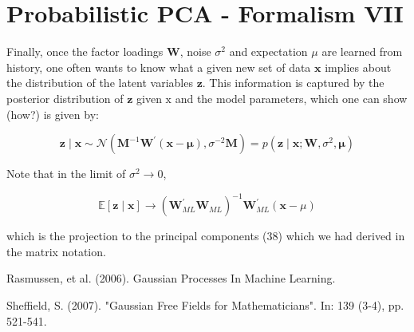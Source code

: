 \documentclass[11pt]{article}
\theoremstyle{plain} %
\theoremstyle{remark}
\begin{document}
\section*{Probabilistic PCA - Formalism VII}
Finally, once the factor loadings $\mathbf{W}$, noise $\sigma^{2}$ and expectation $\mu$ are learned from history, one often wants to know what a given new set of data $\mathbf{x}$ implies about the distribution of the latent variables $\mathbf{z}$. This information is captured by the posterior distribution of $\mathbf{z}$ given $\mathrm{x}$ and the model parameters, which one can show (how?) is given by:

$$
\mathbf{z} \mid \mathbf{x} \sim \mathcal{N}\left(\mathbf{M}^{-1} \mathbf{W}^{\prime}(\mathbf{x}-\boldsymbol{\mu}), \sigma^{-2} \mathbf{M}\right)=p\left(\mathbf{z} \mid \mathbf{x} ; \mathbf{W}, \sigma^{2}, \boldsymbol{\mu}\right)
$$

Note that in the limit of $\sigma^{2} \rightarrow 0$,

$$
\mathbb{E}[\mathbf{z} \mid \mathbf{x}] \rightarrow\left(\mathbf{W}_{M L}^{\prime} \mathbf{W}_{M L}\right)^{-1} \mathbf{W}_{M L}^{\prime}(\mathbf{x}-\mu)
$$

which is the projection to the principal components (38) which we had derived in the matrix notation.



\begin{thebibliography}{2}
  Rasmussen, et al. (2006). Gaussian Processes In Machine Learning.

  Sheffield, S. (2007). "Gaussian Free Fields for Mathematicians". In: 139 (3-4), pp. 521-541.
\end{thebibliography}
\end{document}
